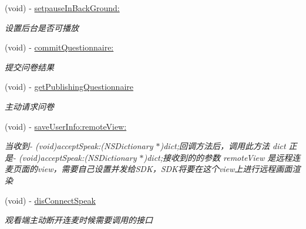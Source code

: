 \begin{DoxyCompactItemize}
\mbox{\label{interface_request_data_a8fbbb99919a9c8b04d62d131d4e1f013}} 
(void) -\/ \hyperlink{interface_request_data_a8fbbb99919a9c8b04d62d131d4e1f013}{setpause\+In\+Back\+Ground\+:}
\begin{DoxyCompactList}\small\item\em 设置后台是否可播放 \end{DoxyCompactList}\item 
\mbox{\label{interface_request_data_a38c258894bd7f0afb2820a0d7bd50658}} 
(void) -\/ \hyperlink{interface_request_data_a38c258894bd7f0afb2820a0d7bd50658}{commit\+Questionnaire\+:}
\begin{DoxyCompactList}\small\item\em 提交问卷结果 \end{DoxyCompactList}\item 
\mbox{\label{interface_request_data_a398f1c6f00717a09ce27aa994aba4ec8}} 
(void) -\/ \hyperlink{interface_request_data_a398f1c6f00717a09ce27aa994aba4ec8}{get\+Publishing\+Questionnaire}
\begin{DoxyCompactList}\small\item\em 主动请求问卷 \end{DoxyCompactList}\item 
\mbox{\label{interface_request_data_ad41b048ed7dd6dafd40543e5e8cb8bd0}} 
(void) -\/ \hyperlink{interface_request_data_ad41b048ed7dd6dafd40543e5e8cb8bd0}{save\+User\+Info\+:remote\+View\+:}
\begin{DoxyCompactList}\small\item\em 当收到-\/ (void)accept\+Speak\+:(\+N\+S\+Dictionary $\ast$)dict;回调方法后，调用此方法 dict 正是-\/ (void)accept\+Speak\+:(\+N\+S\+Dictionary $\ast$)dict;接收到的的参数 remote\+View 是远程连麦页面的view，需要自己设置并发给\+S\+D\+K，\+S\+D\+K将要在这个view上进行远程画面渲染 \end{DoxyCompactList}\item 
\mbox{\label{interface_request_data_aebd00f94f73a4a0e8f844a70587dc862}} 
(void) -\/ \hyperlink{interface_request_data_aebd00f94f73a4a0e8f844a70587dc862}{dis\+Connect\+Speak}
\begin{DoxyCompactList}\small\item\em 观看端主动断开连麦时候需要调用的接口 \end{DoxyCompactList}\item 

\end{DoxyCompactItemize}
